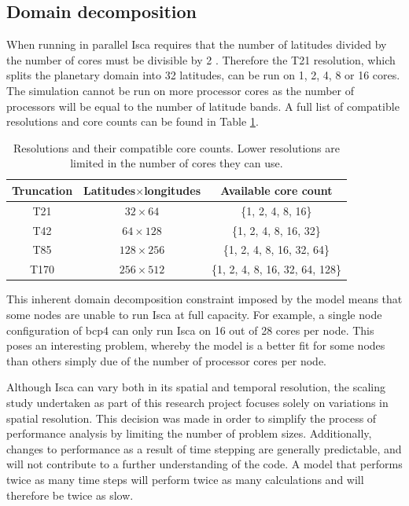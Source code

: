 \documentclass[a4paper,11pt]{report}
\begin{document}
\subsection{Domain decomposition}
When running in parallel Isca requires that the number of latitudes divided by the number of cores must be divisible by 2 \cite{isca2019github}. Therefore the T21 resolution, which splits the planetary domain into 32 latitudes, can be run on 1, 2, 4, 8 or 16 cores. The simulation cannot be run on more processor cores as the number of processors will be equal to the number of latitude bands. A full list of compatible resolutions and core counts can be found in Table \ref{tbl:resolutions}.

\begin{table}[htbp]
\caption[Resolutions and their compatible core counts]{Resolutions and their compatible core counts. Lower resolutions are limited in the number of cores they can use.}
\begin{center}
\begin{tabular}{ c c c }
\toprule
\textbf{Truncation} 	& \textbf{Latitudes}$\times$\textbf{longitudes} 		& \textbf{Available core count} \\\midrule
 T21 				& $32\times64$								& \{1, 2, 4, 8, 16\} \\  
 T42 				& $64\times128$							& \{1, 2, 4, 8, 16, 32\} \\
 T85 				& $128\times256$ 							& \{1, 2, 4, 8, 16, 32, 64\} \\
 T170 			& $256\times512$ 							& \{1, 2, 4, 8, 16, 32, 64, 128\}    \\\bottomrule
\end{tabular}
\label{tbl:resolutions}
\end{center}
\end{table}
\par
This inherent domain decomposition constraint imposed by the model means that some nodes are unable to run Isca at full capacity. For example, a single node configuration of \gls{bcp4} can only run  Isca on 16 out of 28 cores per node. This poses an interesting problem, whereby the model is a better fit for some nodes than others simply due of the number of processor cores per node. 
\par
Although Isca can vary both in its spatial and temporal resolution, the scaling study undertaken as part of this research project focuses solely on variations in spatial resolution. This decision was made in order to simplify the process of performance analysis by limiting the number of problem sizes. Additionally, changes to performance as a result of time stepping are generally predictable, and will not contribute to a further understanding of the code. A model that performs twice as many time steps will perform twice as many calculations and will therefore be twice as slow. 
\end{document}
